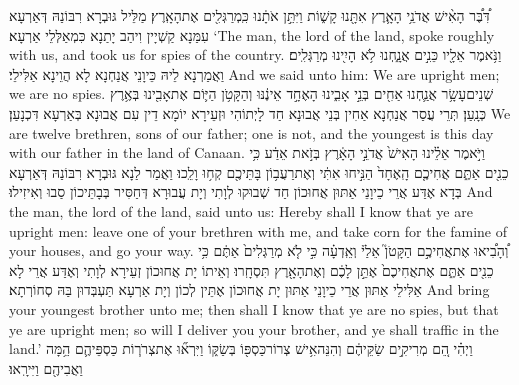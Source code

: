{דִּ֠בֶּ֠ר הָאִ֨ישׁ אֲדֹנֵ֥י הָאָ֛רֶץ אִתָּ֖נוּ קָשׁ֑וֹת וַיִּתֵּ֣ן אֹתָ֔נוּ כִּֽמְרַגְּלִ֖ים אֶת\maqqaf הָאָֽרֶץ׃}
{מַלֵּיל גּוּבְרָא רִבּוֹנַהּ דְּאַרְעָא עִמַּנָא קַשְׁיָין וִיהַב יָתַנָא כִּמְאַלְּלֵי אַרְעָא׃}
{‘The man, the lord of the land, spoke roughly with us, and took us for spies of the country.}{}
{וַנֹּ֥אמֶר אֵלָ֖יו כֵּנִ֣ים אֲנָ֑חְנוּ לֹ֥א הָיִ֖ינוּ מְרַגְּלִֽים׃}
{וַאֲמַרְנָא לֵיהּ כֵּיוָנֵי אֲנַחְנָא לָא הֲוֵינָא אַלִּילֵי׃}
{And we said unto him: We are upright men; we are no spies.}{}
{שְׁנֵים\maqqaf עָשָׂ֥ר אֲנַ֛חְנוּ אַחִ֖ים בְּנֵ֣י אָבִ֑ינוּ הָאֶחָ֣ד אֵינֶ֔נּוּ וְהַקָּטֹ֥ן הַיּ֛וֹם אֶת\maqqaf אָבִ֖ינוּ בְּאֶ֥רֶץ כְּנָֽעַן׃}
{תְּרֵי עֲסַר אֲנַחְנָא אַחִין בְּנֵי אֲבוּנָא חַד לָיְתוֹהִי וּזְעֵירָא יוֹמָא דֵין עִם אֲבוּנָא בְּאַרְעָא דִּכְנָעַן׃}
{We are twelve brethren, sons of our father; one is not, and the youngest is this day with our father in the land of Canaan.}{}
{וַיֹּ֣אמֶר אֵלֵ֗ינוּ הָאִישׁ֙ אֲדֹנֵ֣י הָאָ֔רֶץ בְּזֹ֣את אֵדַ֔ע כִּ֥י כֵנִ֖ים אַתֶּ֑ם אֲחִיכֶ֤ם הָֽאֶחָד֙ הַנִּ֣יחוּ אִתִּ֔י וְאֶת\maqqaf רַעֲב֥וֹן בָּתֵּיכֶ֖ם קְח֥וּ וָלֵֽכוּ׃}
{וַאֲמַר לַנָא גּוּבְרָא רִבּוֹנַהּ דְּאַרְעָא בְּדָא אֶדַּע אֲרֵי כֵיוָנֵי אַתּוּן אֲחוּכוֹן חַד שְׁבוּקוּ לְוָתִי וְיָת עֲבוּרָא דְּחַסִּיר בְּבָתֵּיכוֹן סַבוּ וְאִיזִילוּ׃}
{And the man, the lord of the land, said unto us: Hereby shall I know that ye are upright men: leave one of your brethren with me, and take corn for the famine of your houses, and go your way.}{}
{וְ֠הָבִ֠יאוּ אֶת\maqqaf אֲחִיכֶ֣ם הַקָּטֹן֮ אֵלַי֒ וְאֵֽדְעָ֗ה כִּ֣י לֹ֤א מְרַגְּלִים֙ אַתֶּ֔ם כִּ֥י כֵנִ֖ים אַתֶּ֑ם אֶת\maqqaf אֲחִיכֶם֙ אֶתֵּ֣ן לָכֶ֔ם וְאֶת\maqqaf הָאָ֖רֶץ תִּסְחָֽרוּ׃}
{וְאֵיתוֹ יָת אֲחוּכוֹן זְעֵירָא לְוָתִי וְאֶדַּע אֲרֵי לָא אַלִּילֵי אַתּוּן אֲרֵי כֵיוָנֵי אַתּוּן יָת אֲחוּכוֹן אֶתֵּין לְכוֹן וְיָת אַרְעָא תַּעְבְּדוּן בַּהּ סְחוֹרְתָא׃}
{And bring your youngest brother unto me; then shall I know that ye are no spies, but that ye are upright men; so will I deliver you your brother, and ye shall traffic in the land.’}{}
{וַיְהִ֗י הֵ֚ם מְרִיקִ֣ים שַׂקֵּיהֶ֔ם וְהִנֵּה\maqqaf אִ֥ישׁ צְרוֹר\maqqaf כַּסְפּ֖וֹ בְּשַׂקּ֑וֹ וַיִּרְא֞וּ אֶת\maqqaf צְרֹר֧וֹת כַּסְפֵּיהֶ֛ם הֵ֥מָּה וַאֲבִיהֶ֖ם וַיִּירָֽאוּ׃}
